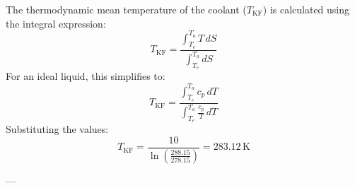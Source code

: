 The thermodynamic mean temperature of the coolant (\( T_{\text{KF}} \)) is calculated using the integral expression:  
\[
T_{\text{KF}} = \frac{\int_{T_e}^{T_a} T \, dS}{\int_{T_e}^{T_a} dS}
\]  
For an ideal liquid, this simplifies to:  
\[
T_{\text{KF}} = \frac{\int_{T_e}^{T_a} c_p \, dT}{\int_{T_e}^{T_a} \frac{c_p}{T} \, dT}
\]  
Substituting the values:  
\[
T_{\text{KF}} = \frac{10}{\ln\left(\frac{288.15}{278.15}\right)} = 283.12 \, \text{K}
\]  

---
